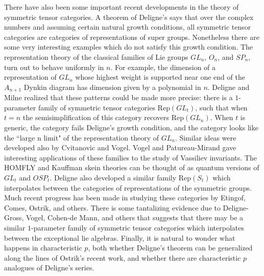 \documentclass[12pt]{article}
\begin{document}
There have also been some important recent developments in the theory of symmetric tensor categories. A theorem of Deligne's says that over the complex numbers and assuming certain natural growth conditions, all symmetric tensor categories are categories of representations of super groups. Nonetheless there are some very interesting examples which do not satisfy this growth condition. The representation theory of the classical families of Lie groups $GL_n$, $O_n$, and $SP_n$, turn out to behave uniformly in $n$. For example, the dimension of a representation of $GL_n$ whose highest weight is supported near one end of the $A_{n+1}$ Dynkin diagram has dimension given by a polynomial in $n$. Deligne and Milne realized that these patterns could be made more precise: there is a $1$-parameter family of symmetric tensor categories $\mathrm{Rep}(GL_t)$, such that when $t=n$ the semisimplification of this category recovers $\mathrm{Rep}(GL_n)$. When $t$ is generic, the category fails Deligne's growth condition, and the category looks like the ``large n limit" of the representation theory of $GL_n$.  Similar ideas were developed also by Cvitanovic and Vogel. Vogel and Patureau-Mirand gave interesting applications of these families to the study of Vassiliev invariants.  The HOMFLY and Kauffman skein theories can be thought of as quantum versions of $GL_t$ and $OSP_t$.  Deligne also developed a similar family $\mathrm{Rep}(S_t)$ which interpolates between the categories of representations of the symmetric groups. Much recent progress has been made in studying these categories by Etingof, Comes, Ostrik, and others. There is some tantalizing evidence due to Deligne-Gross, Vogel, Cohen-de Mann, and others that suggests that there may be a similar $1$-parameter family of symmetric tensor categories which interpolates between the exceptional lie algebras. Finally, it is natural to wonder what happens in characteristic $p$, both whether Deligne's theorem can be generalized along the lines of Ostrik's recent work, and whether there are characteristic $p$ analogues of Deligne's series.
\end{document}
